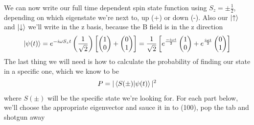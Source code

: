 \documentclass{article}
\begin{document}
We can now write our full time dependent spin state function using $S_z=\pm\frac{1}{2}$, depending on which eigenstate we're next to, up (+) or down (-). Also our  $\ket{\uparrow}$ and $\ket{\downarrow}$ we'll write in the z basis, because the B field is in the z direction
\[
	\ket{\psi(t)} = e^{-i\omega S_{z}t} \left(\frac{1}{\sqrt{2}}\right) \left[ \begin{pmatrix} 1 \\ 0 \end{pmatrix} + \begin{pmatrix} 0 \\ 1 \end{pmatrix} \right]
	= \frac{1}{\sqrt{2}} \left[ e^{\frac{-i\omega t}{2}} \begin{pmatrix} 1 \\ 0 \end{pmatrix} + e^{\frac{i\omega t}{2}}\begin{pmatrix} 0 \\ 1 \end{pmatrix} \right]
\]
The last thing we will need is how to calculate the probability of finding our state in a specific one, which we know to be 
\begin{align}
	P = | \bra{S(\pm)} \ket{\psi(t)} |^2
\end{align}
where $S(\pm)$ will be the specific state we're looking for. For each part below, we'll choose the appropriate eigenvector and sauce it in to (100), pop the tab and shotgun away
\end{document}
